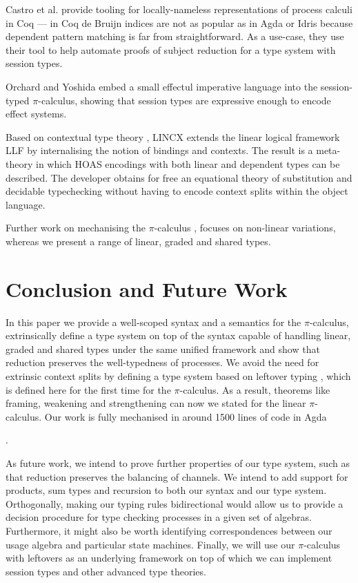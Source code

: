 \documentclass[sigplan,10pt,anonymous,review]{acmart}
\theoremstyle{definition}
\newcommand{\picalc}{$\pi$-calculus}
\begin{document}
Castro et al. \cite{Castro2020} provide tooling for locally-nameless representations of process calculi in Coq  --- in Coq de Bruijn indices are not as popular as in Agda or Idris because dependent pattern matching is far from straightforward.
As a use-case, they use their tool to help automate proofs of subject reduction for a type system with session types.

Orchard and Yoshida \cite{OrchardY16} embed a small effectul imperative language into the session-typed \picalc{}, showing that session types are expressive enough to encode effect systems.

Based on contextual type theory \cite{Pientkaa, Pientka}, LINCX \cite{Georges2017} extends the linear logical framework LLF \cite{Cervesato1996} by internalising the notion of bindings and contexts.
The result is a meta-theory in which HOAS encodings with both linear and dependent types can be described.
The developer obtains for free an equational theory of substitution and decidable typechecking without having to encode context splits within the object language.

Further work on mechanising the \picalc{} \cite{Henry-Gerard1999, Honsell2001a, Bengtson2013, Despeyroux2000, Affeldt2008}, focuses on non-linear variations, whereas we present a range of linear, graded and shared types.

\section{Conclusion and Future Work}

In this paper we provide a well-scoped syntax and a semantics for the \picalc{}, extrinsically define a type system on top of the syntax capable of handling linear, graded and shared types under the same unified framework and show that reduction preserves the well-typedness of processes.
We avoid the need for extrinsic context splits by defining a type system based on leftover typing \cite{Allais2018a}, which is defined here for the first time for the \picalc{}.
As a result, theorems like framing, weakening and strengthening can now we stated for the linear \picalc{}.
Our work is fully mechanised in around 1500 lines of code in Agda%
\begin{anonsuppress}
\cite{Zalakain2020Agda}
\end{anonsuppress}
.

As future work, we intend to prove further properties of our type system, such as that reduction preserves the balancing of channels.
We intend to add support for products, sum types and recursion to both our syntax and our type system.
Orthogonally, making our typing rules bidirectional would allow us to provide a decision procedure for type checking processes in a given set of algebras.
Furthermore, it might also be worth identifying correspondences between our usage algebra and particular state machines.
Finally, we will use our \picalc{} with leftovers as an underlying framework on top of which we can implement session types and other advanced type theories.




\appendix

\end{document}
